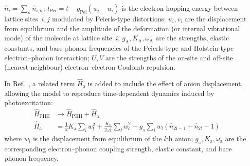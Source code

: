$\hat{n}_i = \sum \limits_\sigma \hat{n}_{i, \sigma}$;
$t_\mathrm{Pei} = t - g_\mathrm{Pei} \left( u_j - u_i\right)$ is the electron hopping energy between lattice sites~$i, j$
modulated by Peierls-type distortions;
$u_i, v_i$ are the displacement from equilibrium and the amplitude of the deformation (or internal vibrational mode)
of the molecule at lattice site~$i$;
$g_\mathrm{A}, K_\mathrm{A}, \omega_\mathrm{A}$ are the strengths, elastic constants, and bare phonon frequencies
of the Peierls-type and Holstein-type electron--phonon interaction;
$U, V$ are the strengths of the on-site and off-site (nearest-neighbour) electron--electron Coulomb repulsion.

In Ref.~\cite{Yonemitsu2007}, a related term $\hat{H}_\mathrm{a}$ is added to include the effect of anion displacement,
allowing the model to reproduce time-dependent dynamics induced by photoexcitation:
%
\begin{equation}
 \begin{aligned}
   \hat{H}_\mathrm{PHH} & \rightarrow \hat{H}_\mathrm{PHH} + \hat{H}_\mathrm{a} \\
   \hat{H}_\mathrm{a} & =
    \frac{1}{2} K_\mathrm{a} \sum_l w_l^2 + \frac{K_\mathrm{a}}{2 \omega_\mathrm{a}^2} \sum_l \dot{w}_l^2 - g_\mathrm{a} \sum_l w_l \left( \hat{n}_{2 l - 1} + \hat{n}_{2 l} - 1 \right)
 \end{aligned}
\end{equation}
%
where $w_l$ is the displacement from equilibrium of the $l$th anion;
$g_\mathrm{a}, K_\mathrm{a}, \omega_\mathrm{a}$ are the corresponding electron--phonon coupling strength, elastic constant,
and bare phonon frequency.
